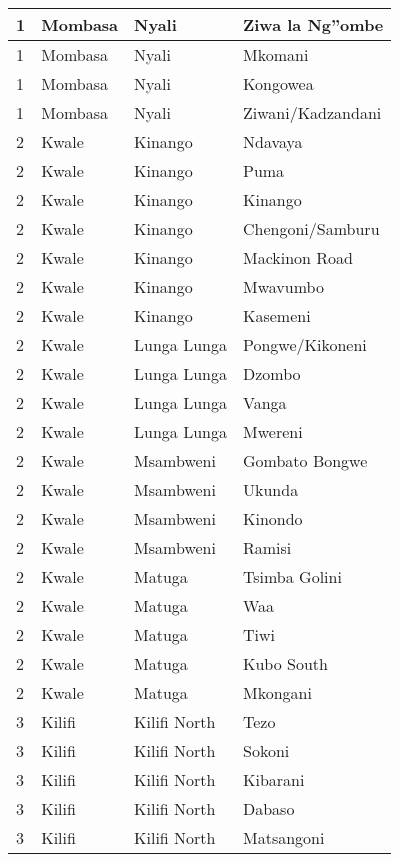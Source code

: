 \begin{table}[!ht]
\begin{tabular}{|l|l|l|l|}
        1 & Mombasa & Nyali & Ziwa la Ng''ombe \\ \hline
        1 & Mombasa & Nyali & Mkomani \\ \hline
        1 & Mombasa & Nyali & Kongowea \\ \hline
        1 & Mombasa & Nyali & Ziwani/Kadzandani \\ \hline
        2 & Kwale & Kinango & Ndavaya \\ \hline
        2 & Kwale & Kinango & Puma \\ \hline
        2 & Kwale & Kinango & Kinango \\ \hline
        2 & Kwale & Kinango & Chengoni/Samburu \\ \hline
        2 & Kwale & Kinango & Mackinon Road \\ \hline
        2 & Kwale & Kinango & Mwavumbo \\ \hline
        2 & Kwale & Kinango & Kasemeni \\ \hline
        2 & Kwale & Lunga Lunga & Pongwe/Kikoneni \\ \hline
        2 & Kwale & Lunga Lunga & Dzombo \\ \hline
        2 & Kwale & Lunga Lunga & Vanga \\ \hline
        2 & Kwale & Lunga Lunga & Mwereni \\ \hline
        2 & Kwale & Msambweni & Gombato Bongwe \\ \hline
        2 & Kwale & Msambweni & Ukunda \\ \hline
        2 & Kwale & Msambweni & Kinondo \\ \hline
        2 & Kwale & Msambweni & Ramisi \\ \hline
        2 & Kwale & Matuga & Tsimba Golini \\ \hline
        2 & Kwale & Matuga & Waa \\ \hline
        2 & Kwale & Matuga & Tiwi \\ \hline
        2 & Kwale & Matuga & Kubo South \\ \hline
        2 & Kwale & Matuga & Mkongani \\ \hline
        3 & Kilifi & Kilifi North & Tezo \\ \hline
        3 & Kilifi & Kilifi North & Sokoni \\ \hline
        3 & Kilifi & Kilifi North & Kibarani \\ \hline
        3 & Kilifi & Kilifi North & Dabaso \\ \hline
        3 & Kilifi & Kilifi North & Matsangoni \\ \hline

\end{tabular}
\end{table}
